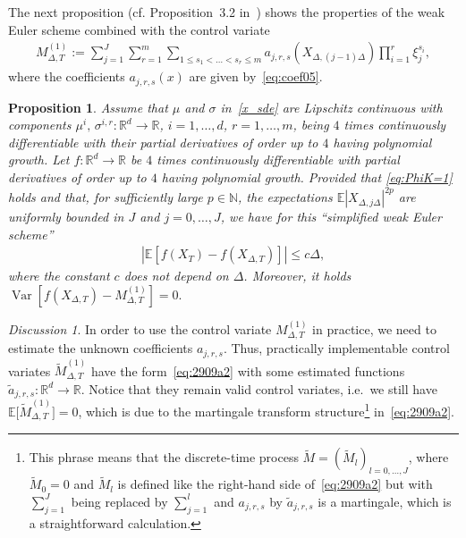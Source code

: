 \documentclass[11pt,a4paper]{amsart}
\theoremstyle{plain}
\newtheorem{proposition}[theorem]{Proposition}
\theoremstyle{definition}
\theoremstyle{remark}
\newtheorem*{discussion}{Discussion}
\numberwithin{equation}{section}
\newcommand*{\E}{\mathbb{E}}
\newcommand*{\R}{\mathbb{R}}
\newcommand*{\Var}{\operatorname{Var}}
\newcommand*{\EE}{\mathbb E}
\newcommand*{\bbR}{\mathbb R}
\renewcommand*{\doteq}{:=}
\begin{document}
The next proposition (cf. Proposition~3.2 in~\cite{belomestny2016variance}) shows the properties of the weak Euler scheme combined with the control variate 
\begin{align}
\label{eq:2909a2}
M^{(1)}_{\Delta,T}\doteq
\sum_{j=1}^J
\sum_{r=1}^m
\sum_{1\le s_1<\ldots<s_r\le m}
a_{j,r,s}(X_{\Delta,(j-1)\Delta})
\prod_{i=1}^r \xi_j^{s_i}, 
\end{align}
where the coefficients
$a_{j,r,s}(x)$ are given by~\eqref{eq:coef05}.

\begin{proposition}
\label{prop:Euler:CV}
Assume that $\mu$ and $\sigma$ in~\eqref{x_sde} are Lipschitz continuous with components $\mu^i,\,\sigma^{i,r}\colon \R^d\to\R$,
$i=1,\ldots,d$, $r=1,\ldots,m$,
being $4$ times continuously differentiable
with their partial derivatives of order up to $4$
having polynomial growth.
Let $f\colon\R^d\to\R$ be $4$ times continuously differentiable with 
partial derivatives of order up to $4$
having polynomial growth.
Provided that \eqref{eq:PhiK=1} holds
and that, for sufficiently large $p\in\mathbb N$,
the expectations $\EE |X_{\Delta,j\Delta}|^{2p}$
are uniformly bounded in $J$ and $j=0,\ldots,J$,
we have for this
``simplified weak Euler scheme''
\begin{align*}
\left|\E\left[f(X_T) - f(X_{\Delta,T})\right]\right|\le c\Delta,
\end{align*}
where the constant $c$ does not depend on $\Delta$. Moreover, it holds
$\Var\left[f(X_{\Delta,T}) - M^{(1)}_{\Delta,T}\right]=0.$
\end{proposition}

\begin{discussion}
In order to use the control variate
$M^{(1)}_{\Delta,T}$
in practice, we need to estimate the unknown coefficients
$a_{j,r,s}$.
Thus, practically implementable control variates
$\widetilde{M}^{(1)}_{\Delta,T}$
have the form~\eqref{eq:2909a2}
with some estimated functions
$\tilde{a}_{j,r,s}\colon\bbR^d\to\bbR$.
Notice that they remain valid control variates,
i.e.\ we still have $\EE\bigl[\widetilde{M}^{(1)}_{\Delta,T}\bigr]=0$,
which is due to the martingale transform
structure\footnote{\label{ft:19102016a1}This phrase means
that the discrete-time process
$\tilde M=(\tilde M_l)_{l=0,\ldots,J}$, where $\tilde M_0=0$ and
$\tilde M_l$ is defined like the right-hand side of~\eqref{eq:2909a2}
but with
$\sum_{j=1}^J$ being replaced by $\sum_{j=1}^l$
and $a_{j,r,s}$ by $\tilde a_{j,r,s}$
is a martingale, which is a straightforward calculation.}
in~\eqref{eq:2909a2}.
\end{discussion}
\end{document}
